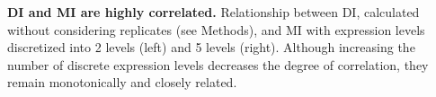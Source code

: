 
\textbf{ DI and MI are highly correlated.} Relationship between DI, calculated without considering replicates (see Methods), and MI with expression levels discretized into 2 levels (left) and 5 levels (right). Although increasing the number of discrete expression levels decreases the degree of correlation, they remain monotonically and closely related.
